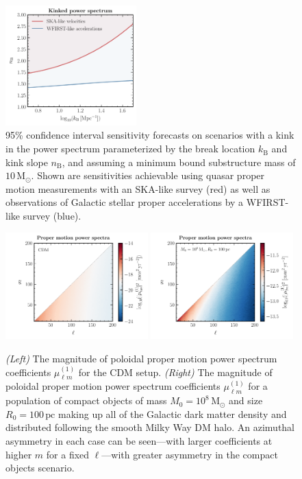 \documentclass[prd,aps,twocolumn,nofootinbib,superscriptaddress,preprintnumbers,balancelastpage,longbibliography,floatfix]{revtex4-1}
\begin{document}
\begin{figure}[!htbp]
\centering
\includegraphics[width=0.45\textwidth]{plots/kink_PS_sig.pdf}
\caption{95\% confidence interval sensitivity forecasts on scenarios with a kink in the power spectrum parameterized by the break location $k_\mathrm{B}$ and kink slope $n_\mathrm{B}$, and assuming a minimum bound substructure mass of $10\,\mathrm M_\odot$. Shown are sensitivities achievable using quasar proper motion measurements with an SKA-like survey (red) as well as observations of Galactic stellar proper accelerations by a WFIRST-like survey (blue). }
\label{fig:kink_ps}
\end{figure}


\begin{figure}[!htbp]
\centering
\includegraphics[width=0.49\textwidth]{plots/m_abs_1.pdf}
\includegraphics[width=0.49\textwidth]{plots/m_compact_abs_1.pdf}
\caption{\emph{(Left)} The magnitude of poloidal proper motion power spectrum coefficients $\mu_{\ell m}^{(1)}$ for the CDM setup. \emph{(Right)} The magnitude of poloidal proper motion power spectrum coefficients $\mu_{\ell m}^{(1)}$ for a population of compact objects of mass $M_0 = 10^8\,\mathrm{M}_\odot$ and size $R_0 = 100\,\mathrm{pc}$ making up all of the Galactic dark matter density and distributed following the smooth Milky Way DM halo. An azimuthal asymmetry in each case can be seen---with larger coefficients at higher $m$ for a fixed $\ell$---with greater asymmetry in the compact objects scenario. }
\label{fig:m_abs}
\end{figure}
\end{document}
